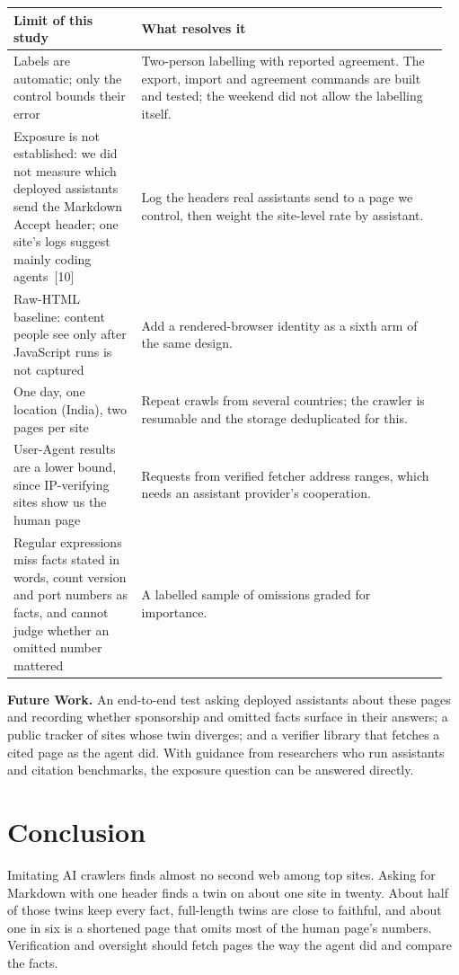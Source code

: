\documentclass[10pt,a4paper]{article}
\begin{document}
{\small\begin{tabular}{@{}p{0.29\linewidth}p{0.67\linewidth}@{}}\toprule
\textbf{Limit of this study} & \textbf{What resolves it}\\\midrule
Labels are automatic; only the control bounds their error & Two-person labelling with reported agreement. The export, import and agreement commands are built and tested; the weekend did not allow the labelling itself.\\
Exposure is not established: we did not measure which deployed assistants send the Markdown Accept header; one site's logs suggest mainly coding agents~[10] & Log the headers real assistants send to a page we control, then weight the site-level rate by assistant.\\
Raw-HTML baseline: content people see only after JavaScript runs is not captured & Add a rendered-browser identity as a sixth arm of the same design.\\
One day, one location (India), two pages per site & Repeat crawls from several countries; the crawler is resumable and the storage deduplicated for this.\\
User-Agent results are a lower bound, since IP-verifying sites show us the human page & Requests from verified fetcher address ranges, which needs an assistant provider's cooperation.\\
Regular expressions miss facts stated in words, count version and port numbers as facts, and cannot judge whether an omitted number mattered & A labelled sample of omissions graded for importance.\\\bottomrule
\end{tabular}}

\textbf{Future Work.} An end-to-end test asking deployed assistants about these pages and recording whether sponsorship and omitted facts surface in their answers; a public tracker of sites whose twin diverges; and a verifier library that fetches a cited page as the agent did. With guidance from researchers who run assistants and citation benchmarks, the exposure question can be answered directly.

\section{Conclusion}
Imitating AI crawlers finds almost no second web among top sites. Asking for Markdown with one header finds a twin on about one site in twenty. About half of those twins keep every fact, full-length twins are close to faithful, and about one in six is a shortened page that omits most of the human page's numbers. Verification and oversight should fetch pages the way the agent did and compare the facts.
\end{document}
